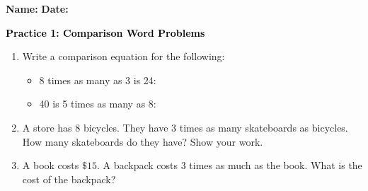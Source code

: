 \documentclass[12pt, letterpaper, fleqn]{article}
\newcommand{\blanklong}{\underline{\hspace{6.5cm}}}
\begin{document}
\textbf{Name:} \underline{\hspace{5cm}}
\hfill
\textbf{Date:} \underline{\hspace{3cm}}\\

\begin{tcolorbox}[colback=customteal!20]
    \large\textcolor{black}{\textbf{Practice 1: Comparison Word Problems}}
\end{tcolorbox}

\vspace{5mm}
\begin{enumerate}[itemsep=3cm, leftmargin=0.6cm]
\item Write a comparison equation for the following:
  \begin{itemize}[itemsep=0.8cm]
    \item 8 times as many as 3 is 24: \blanklong
    \item 40 is 5 times as many as 8: \blanklong
  \end{itemize}

\item A store has 8 bicycles. They have 3 times as many skateboards as bicycles. How many skateboards do they have? Show your work.
\vspace{3.5cm}

\item A book costs $\$15$. A backpack costs 3 times as much as the book. What is the cost of the backpack?
\end{enumerate}
\end{document}

